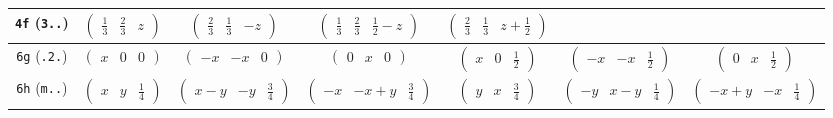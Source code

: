 \documentclass[fleqn,9pt,landscape]{jsarticle}
\begin{document}
\begin{center}
\begin{longtable}{ccccccc}
{\tt 4f} ({\tt 3..}) & $ \begin{pmatrix} \frac{1}{3} & \frac{2}{3} & z \end{pmatrix} $ & $ \begin{pmatrix} \frac{2}{3} & \frac{1}{3} & - z \end{pmatrix} $ & $ \begin{pmatrix} \frac{1}{3} & \frac{2}{3} & \frac{1}{2} - z \end{pmatrix} $ & $ \begin{pmatrix} \frac{2}{3} & \frac{1}{3} & z + \frac{1}{2} \end{pmatrix} $ & $  $ & $  $ \\ \hline
{\tt 6g} ({\tt .2.}) & $ \begin{pmatrix} x & 0 & 0 \end{pmatrix} $ & $ \begin{pmatrix} - x & - x & 0 \end{pmatrix} $ & $ \begin{pmatrix} 0 & x & 0 \end{pmatrix} $ & $ \begin{pmatrix} x & 0 & \frac{1}{2} \end{pmatrix} $ & $ \begin{pmatrix} - x & - x & \frac{1}{2} \end{pmatrix} $ & $ \begin{pmatrix} 0 & x & \frac{1}{2} \end{pmatrix} $ \\ \hline
{\tt 6h} ({\tt m..}) & $ \begin{pmatrix} x & y & \frac{1}{4} \end{pmatrix} $ & $ \begin{pmatrix} x - y & - y & \frac{3}{4} \end{pmatrix} $ & $ \begin{pmatrix} - x & - x + y & \frac{3}{4} \end{pmatrix} $ & $ \begin{pmatrix} y & x & \frac{3}{4} \end{pmatrix} $ & $ \begin{pmatrix} - y & x - y & \frac{1}{4} \end{pmatrix} $ & $ \begin{pmatrix} - x + y & - x & \frac{1}{4} \end{pmatrix} $ \\ \hline

\end{longtable}
\end{center}
\end{document}
